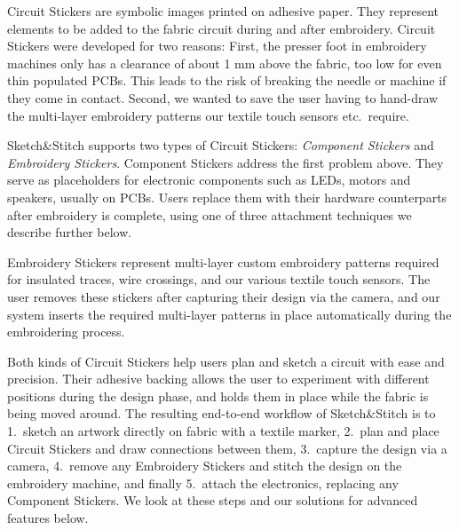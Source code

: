 \documentclass{sigchi}
\begin{document}
Circuit Stickers are symbolic images printed on adhesive paper. %
They represent elements to be added to the fabric circuit during and after embroidery. Circuit Stickers were developed for two reasons: First, the presser foot in embroidery machines only has a clearance of about 1 mm above the fabric, too low for even thin populated PCBs. This leads to the risk of breaking the needle or machine if they come in contact. Second, we wanted to save the user having to hand-draw the multi-layer embroidery patterns our textile touch sensors etc.\ require.

Sketch\&Stitch supports two types of Circuit Stickers: \emph{Component Stickers} and \emph{Embroidery Stickers}. Component Stickers address the first problem above. They serve as placeholders for electronic components such as LEDs, motors and speakers, usually on PCBs. Users replace them with their hardware counterparts after embroidery is complete, using one of three attachment techniques we describe further below.

Embroidery Stickers represent multi-layer custom embroidery patterns required for insulated traces, wire crossings, and our various textile touch sensors.
The user removes these stickers after capturing their design via the camera, and our system inserts the required multi-layer patterns in place automatically during the embroidering process.

Both kinds of Circuit Stickers help users plan and sketch a circuit with ease and precision. Their adhesive backing allows the user to experiment with different positions  during the design phase, and holds them in place while the fabric is being moved around.
The resulting end-to-end workflow of Sketch\&Stitch is to 1.\ sketch an artwork directly on fabric with a textile marker, 2.\ plan and place Circuit Stickers and draw connections between them, 3.\ capture the design via a camera, 4.\ remove any Embroidery Stickers and stitch the design on the embroidery machine, and finally 5.\ attach the electronics, replacing any Component Stickers. We look at these steps and our solutions for advanced features below.

\end{document}
